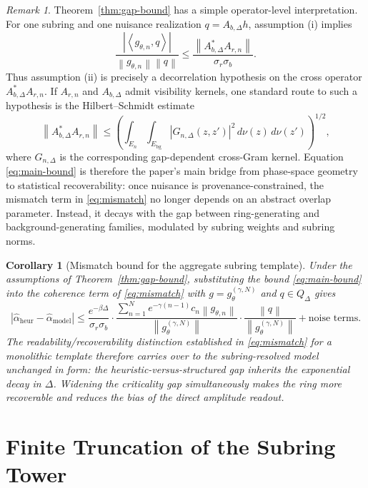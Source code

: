\documentclass[11pt,a4paper]{article}
\newtheorem{corollary}{Corollary}
\theoremstyle{definition}
\theoremstyle{remark}
\newtheorem{remark}{Remark}
\newcommand{\inner}[2]{\left\langle #1, #2 \right\rangle}
\newcommand{\norm}[1]{\left\lVert #1 \right\rVert}
\newcommand{\abs}[1]{\left\lvert #1 \right\rvert}
\begin{document}
\begin{remark}
Theorem~\ref{thm:gap-bound} has a simple operator-level interpretation. For one subring and one nuisance realization $q=A_{b,\Delta}h$, assumption (i) implies
\[
\frac{\abs{\inner{g_{\theta,n}}{q}}}{\norm{g_{\theta,n}}\norm{q}}
\le
\frac{\norm{A_{b,\Delta}^{*}A_{r,n}}}{\sigma_r\sigma_b}.
\]
Thus assumption (ii) is precisely a decorrelation hypothesis on the cross operator $A_{b,\Delta}^{*}A_{r,n}$. If $A_{r,n}$ and $A_{b,\Delta}$ admit visibility kernels, one standard route to such a hypothesis is the Hilbert--Schmidt estimate
\[
\norm{A_{b,\Delta}^{*}A_{r,n}}
\le
\left(
\int_{E_n}\!\int_{E_{\mathrm{bg}}}
\abs{G_{n,\Delta}(z,z')}^2\,d\nu(z)\,d\nu(z')
\right)^{1/2},
\]
where $G_{n,\Delta}$ is the corresponding gap-dependent cross-Gram kernel. Equation \eqref{eq:main-bound} is therefore the paper's main bridge from phase-space geometry to statistical recoverability: once nuisance is provenance-constrained, the mismatch term in \eqref{eq:mismatch} no longer depends on an abstract overlap parameter. Instead, it decays with the gap between ring-generating and background-generating families, modulated by subring weights and subring norms.
\end{remark}

\begin{corollary}[Mismatch bound for the aggregate subring template]
\label{cor:aggregate-mismatch}
Under the assumptions of Theorem~\ref{thm:gap-bound}, substituting the bound \eqref{eq:main-bound} into the coherence term of \eqref{eq:mismatch} with $g = g_{\theta}^{(\gamma,N)}$ and $q \in Q_\Delta$ gives
\begin{equation}
\abs{\hat\alpha_{\mathrm{heur}} - \hat\alpha_{\mathrm{model}}}
\le
\frac{e^{-\beta\Delta}}{\sigma_r\sigma_b}
\cdot
\frac{\sum_{n=1}^{N} e^{-\gamma(n-1)} c_n \norm{g_{\theta,n}}}
{\norm{g_{\theta}^{(\gamma,N)}}}
\cdot
\frac{\norm{q}}{\norm{g_{\theta}^{(\gamma,N)}}}
+
\text{noise terms}.
\label{eq:aggregate-mismatch}
\end{equation}
The readability/recoverability distinction established in \eqref{eq:mismatch} for a monolithic template therefore carries over to the subring-resolved model unchanged in form: the heuristic-versus-structured gap inherits the exponential decay in $\Delta$. Widening the criticality gap simultaneously makes the ring more recoverable and reduces the bias of the direct amplitude readout.
\end{corollary}

\section{Finite Truncation of the Subring Tower}
\end{document}
